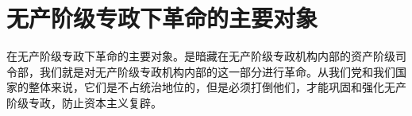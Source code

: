 \section[无产阶级专政下革命的主要对象（一九六七年八月）]{无产阶级专政下革命的主要对象}


在无产阶级专政下革命的主要对象。是暗藏在无产阶级专政机构内部的资产阶级司令部，我们就是对无产阶级专政机构内部的这一部分进行革命。从我们党和我们国家的整体来说，它们是不占统治地位的，但是必须打倒他们，才能巩固和强化无产阶级专政，防止资本主义复辟。


